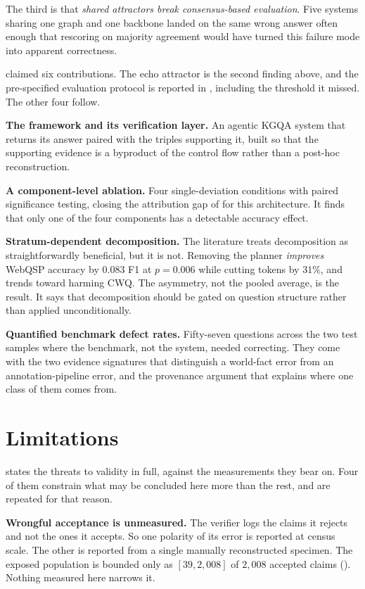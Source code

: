 The third is that \emph{shared attractors break consensus-based evaluation}.
Five systems sharing one graph and one backbone landed on the same wrong answer
often enough that rescoring on majority agreement would have turned this failure
mode into apparent correctness.

 claimed six contributions. The echo attractor is the
second finding above, and the pre-specified evaluation protocol is reported in
, including the threshold it missed. The other four
follow.

\textbf{The framework and its verification layer.} An agentic KGQA system that
returns its answer paired with the triples supporting it, built so that the
supporting evidence is a byproduct of the control flow rather than a post-hoc
reconstruction.

\textbf{A component-level ablation.} Four single-deviation conditions with
paired significance testing, closing the attribution gap of
 for this architecture. It finds that only one of the four
components has a detectable accuracy effect.

\textbf{Stratum-dependent decomposition.} The literature treats decomposition as
straightforwardly beneficial, but it is not. Removing the planner
\emph{improves}
WebQSP accuracy by $0.083$ F1 at $p = 0.006$ while cutting tokens by $31\%$, and
trends toward harming CWQ. The asymmetry, not the pooled average, is the result.
It says that decomposition should be gated on question structure rather than
applied unconditionally.

\textbf{Quantified benchmark defect rates.} Fifty-seven questions across the two
test samples where the benchmark, not the system, needed correcting. They come
with the two evidence signatures that distinguish a world-fact error from an
annotation-pipeline error, and the provenance argument that explains where one
class of them comes from.

\section{Limitations}\label{sec:limitations-final}

 states the threats to validity in full, against the
measurements they bear on. Four of them constrain what may be concluded here
more than the rest, and are repeated for that reason.

\textbf{Wrongful acceptance is unmeasured.} The verifier logs the claims it
rejects and not the ones it accepts. So one polarity of its error is reported at
census scale. The other is reported from a single manually reconstructed
specimen. The exposed population is bounded only as $[39, 2{,}008]$ of $2{,}008$
accepted claims (). Nothing measured here narrows
it.

